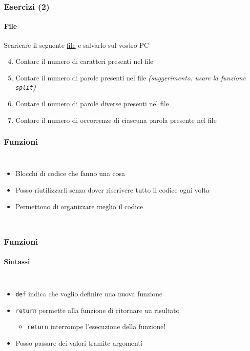 \begin{exerciseframe}
    \frametitle{Esercizi (2)}
    \framesubtitle{File}

    Scaricare il seguente \href{https://raw.githubusercontent.com/DavidePonzini/didattica/refs/heads/main/moby_dick.txt}{file} e salvarlo sul vostro PC
    
    \begin{enumerate}
        \setcounter{enumi}{3}
        \item Contare il numero di caratteri presenti nel file
        \item Contare il numero di parole presenti nel file \textit{(suggerimento: usare la funzione \texttt{split})}
        \item Contare il numero di parole diverse presenti nel file
        \item Contare il numero di occorrenze di ciascuna parola presente nel file
    \end{enumerate}
\end{exerciseframe}


\begin{contentframe}
    \frametitle{Funzioni}

    \begin{columns}
        \begin{itemize}
            \item Blocchi di codice che fanno una cosa
            \item Posso riutilizzarli senza dover riscrivere tutto il codice ogni volta
            \item Permettono di organizzare meglio il codice
        \end{itemize}
        
        \centering
    \end{columns}
\end{contentframe}

\begin{contentframe}
    \frametitle{Funzioni}
    \framesubtitle{Sintassi}

    \begin{columns}
        \begin{itemize}
            \item \texttt{def} indica che voglio definire una nuova funzione
            \bigskip
            \item \texttt{return} permette alla funzione di ritornare un risultato
            \begin{itemize}
                \item \texttt{return} interrompe l'esecuzione della funzione!
            \end{itemize}
            \bigskip
            \item Posso passare dei valori tramite argomenti
        \end{itemize}
        
        \centering
    \end{columns}
\end{contentframe}


